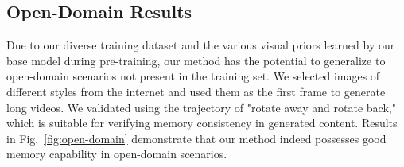 \subsection{Open-Domain Results}

Due to our diverse training dataset and the various visual priors learned by our base model during pre-training, our method has the potential to generalize to open-domain scenarios not present in the training set. We selected images of different styles from the internet and used them as the first frame to generate long videos. We validated using the trajectory of "rotate away and rotate back," which is suitable for verifying memory consistency in generated content. Results in Fig.~\ref{fig:open-domain} demonstrate that our method indeed possesses good memory capability in open-domain scenarios.


